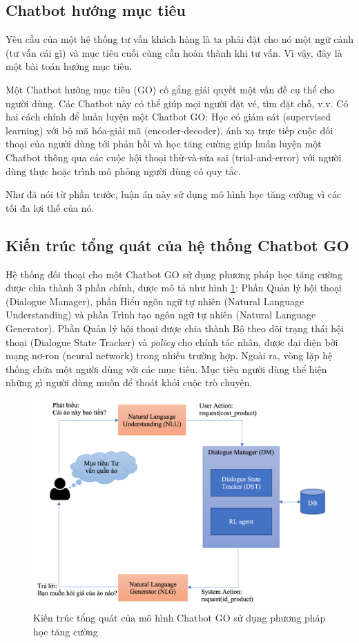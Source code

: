 \subsection{Chatbot hướng mục tiêu}
\label{subsec:chatbotgo}
Yêu cầu của một hệ thống tư vấn khách hàng là ta phải đặt cho nó
một ngữ cảnh (tư vấn cái gì) và mục tiêu cuối cùng cần hoàn thành
khi tư vấn. Vì vậy, đây là một bài toán hướng mục tiêu.

Một Chatbot hướng mục tiêu (GO) cố gắng giải quyết một vấn đề
cụ thể cho người dùng. Các Chatbot này có thể giúp mọi người đặt vé,
tìm đặt chỗ, v.v. Có hai cách chính để huấn luyện một Chatbot GO:
Học có giám sát (supervised learning) với bộ mã hóa-giải mã
(encoder-decoder), ánh xạ trực tiếp cuộc đối thoại của người dùng
tới phản hồi và học tăng cường giúp huấn luyện một Chatbot
thông qua các cuộc hội thoại thử-và-sửa sai (trial-and-error) với
người dùng thực hoặc trình mô phỏng người dùng có quy tắc.

Như đã nói từ phần trước, luận án này sử dụng mô hình học tăng cường
vì các tối đa lợi thế của nó.

\subsection{Kiến trúc tổng quát của hệ thống Chatbot GO}
Hệ thống đối thoại cho một Chatbot GO sử dụng phương pháp
học tăng cường được chia thành 3 phần chính, được mô tả như hình
\ref{fig:chatbot}: Phần Quản lý hội thoại (Dialogue Manager), phần
Hiểu ngôn ngữ tự nhiên (Natural Language Understanding) và phần
Trình tạo ngôn ngữ tự nhiên (Natural Language Generator). Phần
Quản lý hội thoại được chia thành Bộ theo dõi trạng thái hội thoại
(Dialogue State Tracker) và \textit{policy} cho chính tác nhân, được
đại diện bởi mạng nơ-ron (neural network) trong nhiều trường hợp.
Ngoài ra, vòng lặp hệ thống chứa một người dùng với các mục tiêu.
Mục tiêu người dùng thể hiện những gì người dùng muốn để thoát khỏi
cuộc trò chuyện.

\begin{figure}[ht]
    \centering
    \includegraphics[scale=0.8]{thesis/chatbot/kienthuc/img/overviewchatbot.png}
    \caption{Kiến trúc tổng quát của mô hình Chatbot GO sử dụng
    phương pháp học tăng cường}
    \label{fig:chatbot}
\end{figure}

